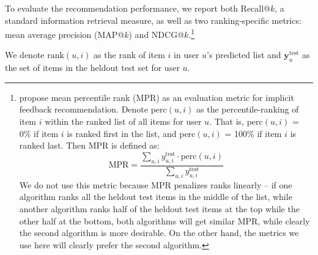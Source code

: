 To evaluate the recommendation performance, we report both Recall@$k$, a standard
information retrieval measure, as well as two ranking-specific
metrics: mean average precision (MAP@$k$) and
NDCG@$k$.\footnote{\citet{hu2008collaborative} propose mean percentile
rank (MPR) as an evaluation metric for implicit feedback recommendation. Denote perc$(u, i)$ as the percentile-ranking of item $i$ within the ranked list of all items for user $u$. That is, perc$(u, i)$ = 0\% if item $i$ is ranked first in the list, and perc$(u, i)$ = 100\% if item $i$ is ranked last. Then MPR is defined as:
\begin{displaymath}
\text{MPR} = \frac{\sum_{u, i} y^{\text{test}}_{u, i} \cdot \text{perc}(u, i)}{\sum_{u, i} y^{\text{test}}_{u, i}}
\end{displaymath}
We do not use this metric because MPR penalizes ranks linearly -- if one algorithm ranks all the heldout test items in the middle of the list, while another algorithm ranks half of the heldout test items at the top while the other half at the bottom, both algorithms will get similar MPR, while clearly the second algorithm is more desirable. On the other hand, the metrics we use here will clearly prefer the second algorithm.}

We denote $\text{rank}(u, i)$ as the rank of item $i$ in user $u$'s
predicted list and $\mathbf{y}_u^{\text{test}}$ as the set of items in the
heldout test set for user $u$.


